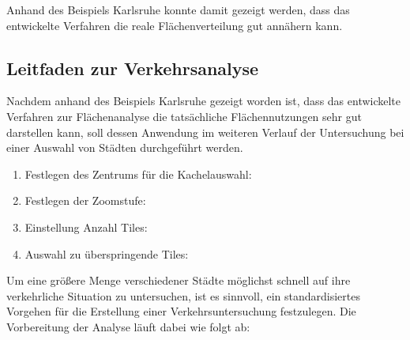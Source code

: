 Anhand des Beispiels Karlsruhe konnte damit gezeigt werden, dass das entwickelte Verfahren die reale Flächenverteilung gut annähern kann. 

\subsection{Leitfaden zur Verkehrsanalyse}
Nachdem anhand des Beispiels Karlsruhe gezeigt worden ist, dass das entwickelte Verfahren zur Flächenanalyse die tatsächliche Flächennutzungen sehr gut darstellen kann, soll dessen Anwendung im weiteren Verlauf der Untersuchung bei einer Auswahl von Städten durchgeführt werden.
\begin{enumerate}
\item Festlegen des Zentrums für die Kachelauswahl:
\item Festlegen der Zoomstufe:
\item Einstellung Anzahl Tiles:
\item Auswahl zu überspringende Tiles:
\end{enumerate}


Um eine größere Menge verschiedener Städte möglichst schnell auf ihre verkehrliche Situation zu untersuchen, ist es sinnvoll, ein standardisiertes Vorgehen für die Erstellung einer Verkehrsuntersuchung festzulegen. Die Vorbereitung der Analyse läuft dabei wie folgt ab:

